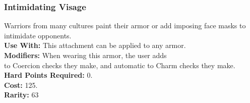 \subsubsection{Intimidating Visage}
Warriors from many cultures paint their armor or add
imposing face masks to intimidate opponents.\\
\textbf{Use With:} This attachment can be applied to any armor.\\
\textbf{Modifiers:} When wearing this armor, the user adds\\
\success to Coercion checks they make, and automatic \failure to
    Charm checks they make.\\
\textbf{Hard Points Required:} 0.\\
\textbf{Cost:} 125.\\
\textbf{Rarity:} 63\\

